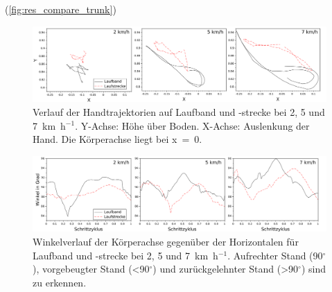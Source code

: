 (\autoref{fig:res_compare_trunk})\\
\begin{figure}[h!]
	\centering
	\includegraphics[width=\linewidth]{bilder/Ergebnisse/compare_hand}
	\caption[Handtrajektorien auf dem Laufband und -strecke]{Verlauf der Handtrajektorien auf Laufband und -strecke bei 2, 5 und 7~km~h$^{-1}$. Y-Achse: Höhe über Boden. X-Achse: Auslenkung der Hand. Die Körperachse liegt bei x~=~0.}
	\label{fig:res_compare_hand}
\end{figure}
\begin{figure}[h!]
	\centering
	\includegraphics[width=\linewidth]{bilder/Ergebnisse/compare_trunk}
	\caption[Winkelverlauf der Körperachse auf Laufband und -strecke]{Winkelverlauf der Körperachse gegenüber der Horizontalen für Laufband und -strecke bei 2, 5 und 7~km~h$^{-1}$. Aufrechter Stand (90$^{\circ}$), vorgebeugter Stand (<90$^{\circ}$) und zurückgelehnter Stand (>90$^{\circ}$) sind zu erkennen.}
	\label{fig:res_compare_trunk}
\end{figure}


